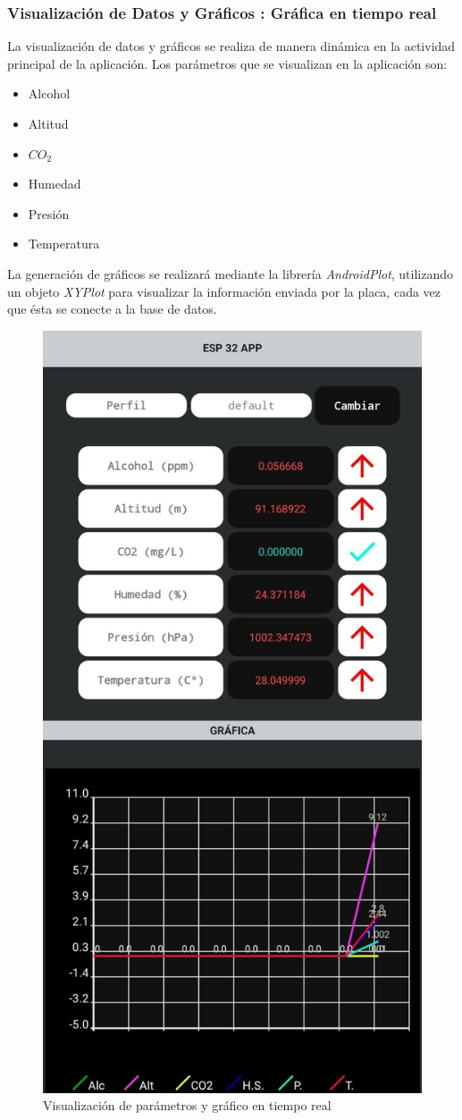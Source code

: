 \documentclass[../main]{subfiles}
\begin{document}
\subsubsection{Visualización de Datos y Gráficos : Gráfica en tiempo real}
La visualización de datos y gráficos se realiza de manera dinámica en la actividad principal de la aplicación.
Los parámetros que se visualizan en la aplicación son:
\begin{itemize}
	\item Alcohol
	\item Altitud
	\item $CO_2$
	\item Humedad
	\item Presión
	\item Temperatura
\end{itemize}
La generación de gráficos se realizará mediante la librería \textit{AndroidPlot}, utilizando un objeto \textit{XYPlot} para visualizar la información enviada por la placa, cada vez que
ésta se conecte a la base de datos.
\begin{figure}[H]
	\centering
	\includegraphics[scale=0.35]{res/uiPreview.jpg}
	\caption{Visualización de parámetros y gráfico en tiempo real}
	\label{FiguraDeGráficos}
\end{figure}
\end{document}
